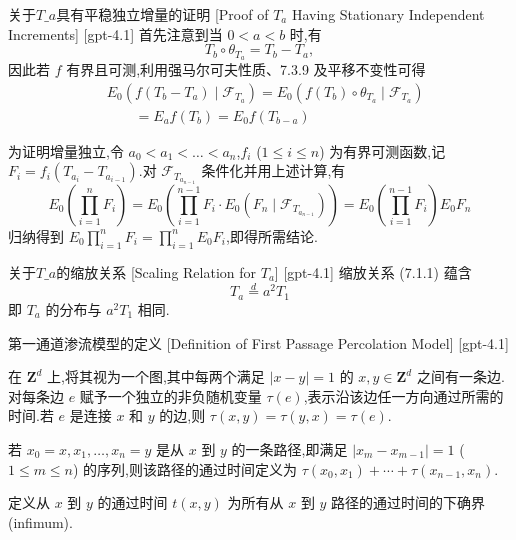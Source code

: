 \documentclass[UTF8]{ctexart}
\begin{document}
    \begin{prf}
        {关于$T\_a$具有平稳独立增量的证明}
        [Proof of $T_a$ Having Stationary Independent Increments]
        [gpt-4.1]
        首先注意到当 $0 < a < b$ 时,有
\[
T_b \circ \theta_{T_a} = T_b - T_a,
\]
因此若 $f$ 有界且可测,利用强马尔可夫性质、7.3.9 及平移不变性可得
\[
\begin{aligned}
& E_0\left( f(T_b - T_a) \mid \mathcal{F}_{T_a} \right) = E_0\left( f(T_b) \circ \theta_{T_a} \mid \mathcal{F}_{T_a} \right) \\
& \qquad = E_a f(T_b) = E_0 f(T_{b - a})
\end{aligned}
\]

为证明增量独立,令 $a_0 < a_1 < \ldots < a_n$,$f_i$ ($1 \leq i \leq n$) 为有界可测函数,记 $F_i = f_i(T_{a_i} - T_{a_{i-1}})$.对 $\mathcal{F}_{T_{a_{n-1}}}$ 条件化并用上述计算,有
\[
E_0\left( \prod_{i=1}^n F_i \right) = E_0\left( \prod_{i=1}^{n-1} F_i \cdot E_0( F_n \mid \mathcal{F}_{T_{a_{n-1}}} ) \right) = E_0\left( \prod_{i=1}^{n-1} F_i \right) E_0 F_n
\]
归纳得到 $E_0 \prod_{i=1}^n F_i = \prod_{i=1}^n E_0 F_i$,即得所需结论.

    \end{prf}
    
    
    
    \begin{ppt}
        {关于$T\_a$的缩放关系}
        [Scaling Relation for $T_a$]
        [gpt-4.1]
        缩放关系 (7.1.1) 蕴含
\[
T_a \overset{d}{=} a^2 T_1
\]
即 $T_a$ 的分布与 $a^2 T_1$ 相同.

    \end{ppt}
    
    
    
    \begin{dfn}
        {第一通道渗流模型的定义}
        [Definition of First Passage Percolation Model]
        [gpt-4.1]
        
在 $\mathbf{Z}^d$ 上,将其视为一个图,其中每两个满足 $|x - y| = 1$ 的 $x, y \in \mathbf{Z}^d$ 之间有一条边.对每条边 $e$ 赋予一个独立的非负随机变量 $\tau(e)$,表示沿该边任一方向通过所需的时间.若 $e$ 是连接 $x$ 和 $y$ 的边,则 $\tau(x, y) = \tau(y, x) = \tau(e)$.

若 $x_0 = x, x_1, \ldots, x_n = y$ 是从 $x$ 到 $y$ 的一条路径,即满足 $|x_m - x_{m-1}| = 1$ ($1 \leq m \leq n$) 的序列,则该路径的通过时间定义为 $\tau(x_0, x_1) + \cdots + \tau(x_{n-1}, x_n)$.

定义从 $x$ 到 $y$ 的通过时间 $t(x, y)$ 为所有从 $x$ 到 $y$ 路径的通过时间的下确界(infimum).

    \end{dfn}
    
\end{document}
